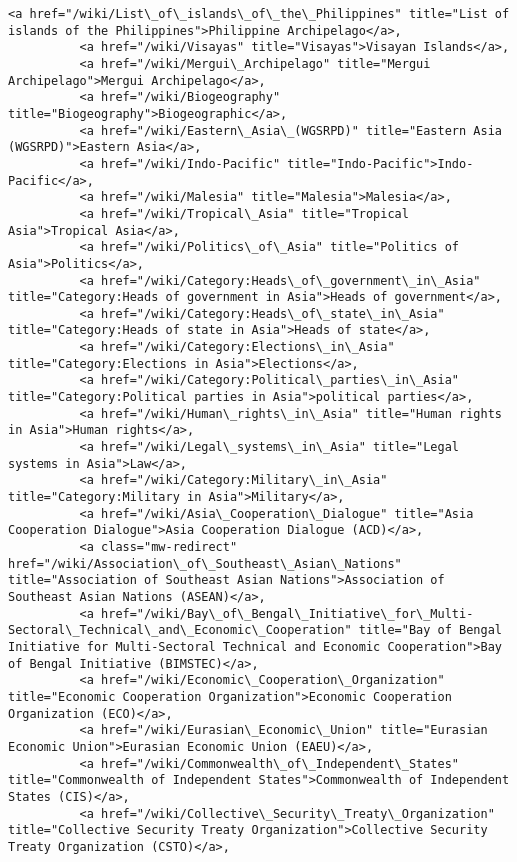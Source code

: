\documentclass[11pt]{article}
\begin{document}
\begin{Verbatim}[commandchars=\\\{\}]
          <a href="/wiki/List\_of\_islands\_of\_the\_Philippines" title="List of islands of the Philippines">Philippine Archipelago</a>,
          <a href="/wiki/Visayas" title="Visayas">Visayan Islands</a>,
          <a href="/wiki/Mergui\_Archipelago" title="Mergui Archipelago">Mergui Archipelago</a>,
          <a href="/wiki/Biogeography" title="Biogeography">Biogeographic</a>,
          <a href="/wiki/Eastern\_Asia\_(WGSRPD)" title="Eastern Asia (WGSRPD)">Eastern Asia</a>,
          <a href="/wiki/Indo-Pacific" title="Indo-Pacific">Indo-Pacific</a>,
          <a href="/wiki/Malesia" title="Malesia">Malesia</a>,
          <a href="/wiki/Tropical\_Asia" title="Tropical Asia">Tropical Asia</a>,
          <a href="/wiki/Politics\_of\_Asia" title="Politics of Asia">Politics</a>,
          <a href="/wiki/Category:Heads\_of\_government\_in\_Asia" title="Category:Heads of government in Asia">Heads of government</a>,
          <a href="/wiki/Category:Heads\_of\_state\_in\_Asia" title="Category:Heads of state in Asia">Heads of state</a>,
          <a href="/wiki/Category:Elections\_in\_Asia" title="Category:Elections in Asia">Elections</a>,
          <a href="/wiki/Category:Political\_parties\_in\_Asia" title="Category:Political parties in Asia">political parties</a>,
          <a href="/wiki/Human\_rights\_in\_Asia" title="Human rights in Asia">Human rights</a>,
          <a href="/wiki/Legal\_systems\_in\_Asia" title="Legal systems in Asia">Law</a>,
          <a href="/wiki/Category:Military\_in\_Asia" title="Category:Military in Asia">Military</a>,
          <a href="/wiki/Asia\_Cooperation\_Dialogue" title="Asia Cooperation Dialogue">Asia Cooperation Dialogue (ACD)</a>,
          <a class="mw-redirect" href="/wiki/Association\_of\_Southeast\_Asian\_Nations" title="Association of Southeast Asian Nations">Association of Southeast Asian Nations (ASEAN)</a>,
          <a href="/wiki/Bay\_of\_Bengal\_Initiative\_for\_Multi-Sectoral\_Technical\_and\_Economic\_Cooperation" title="Bay of Bengal Initiative for Multi-Sectoral Technical and Economic Cooperation">Bay of Bengal Initiative (BIMSTEC)</a>,
          <a href="/wiki/Economic\_Cooperation\_Organization" title="Economic Cooperation Organization">Economic Cooperation Organization (ECO)</a>,
          <a href="/wiki/Eurasian\_Economic\_Union" title="Eurasian Economic Union">Eurasian Economic Union (EAEU)</a>,
          <a href="/wiki/Commonwealth\_of\_Independent\_States" title="Commonwealth of Independent States">Commonwealth of Independent States (CIS)</a>,
          <a href="/wiki/Collective\_Security\_Treaty\_Organization" title="Collective Security Treaty Organization">Collective Security Treaty Organization (CSTO)</a>,

\end{Verbatim}
\end{document}
